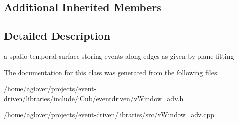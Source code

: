 \subsection*{Additional Inherited Members}


\subsection{Detailed Description}
a spatio-\/temporal surface storing events along edges as given by plane fitting 

The documentation for this class was generated from the following files\+:\begin{DoxyCompactItemize}
\item 
/home/aglover/projects/event-\/driven/libraries/include/i\+Cub/eventdriven/v\+Window\+\_\+adv.\+h\item 
/home/aglover/projects/event-\/driven/libraries/src/v\+Window\+\_\+adv.\+cpp\end{DoxyCompactItemize}
